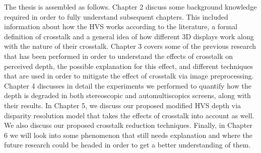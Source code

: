 The thesis is assembled as follows. Chapter 2 discuss some background knowledge required in order to fully understand subsequent chapters. This included information about how the HVS works according to the literature, a formal definition of crosstalk and a general idea of how different 3D displays work along with the nature of their crosstalk. Chapter 3 covers some of the previous research that has been performed in order to understand the effects of crosstalk on perceived depth, the possible explanation for this effect, and different techniques that are used in order to mitigate the effect of crosstalk via image preprocessing. Chapter 4 discusses in detail the experiments we performed to quantify how the depth is degraded in both stereoscopic and automultiscopics screens, along with their results. In Chapter 5, we discuss our proposed modified HVS depth via disparity resolution model that takes the effects of crosstalk into account as well. We also discuss our proposed crosstalk reduction techniques. Finally, in Chapter 6 we will look into some phenomenon that still needs explanation and where the future research could be headed in order to get a better understanding of them.



